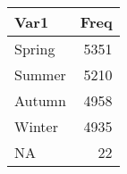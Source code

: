 
\begin{tabular}[t]{lr}
\toprule
Var1 & Freq\\
\midrule
Spring & 5351\\
Summer & 5210\\
Autumn & 4958\\
Winter & 4935\\
NA & 22\\
\bottomrule
\end{tabular}